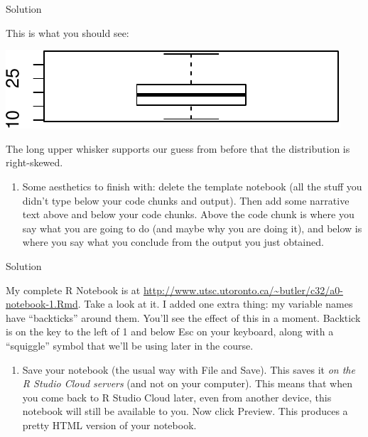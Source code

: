 \documentclass[]{tufte-book}
\newenvironment{Shaded}{}{}
\newcommand{\KeywordTok}[1]{\textcolor[rgb]{0.00,0.44,0.13}{\textbf{#1}}}
\newcommand{\NormalTok}[1]{#1}
\newcommand{\OperatorTok}[1]{\textcolor[rgb]{0.40,0.40,0.40}{#1}}
\providecommand{\tightlist}{%
  \setlength{\itemsep}{0pt}\setlength{\parskip}{0pt}}
\theoremstyle{definition}
\theoremstyle{definition}
\theoremstyle{definition}
\theoremstyle{remark}
\begin{document}
Solution

This is what you should see:

\begin{Shaded}
\end{Shaded}

\includegraphics{01-getting-used_files/figure-latex/unnamed-chunk-8-1}

The long upper whisker supports our guess from before that the
distribution is right-skewed.

\begin{enumerate}
\def\labelenumi{(\alph{enumi})}
\setcounter{enumi}{7}
\tightlist
\item
  Some aesthetics to finish with: delete the template notebook (all the
  stuff you didn't type below your code chunks and output). Then add
  some narrative text above and below your code chunks. Above the code
  chunk is where you say what you are going to do (and maybe why you are
  doing it), and below is where you say what you conclude from the
  output you just obtained.
\end{enumerate}

Solution

My complete R Notebook is at
\url{http://www.utsc.utoronto.ca/~butler/c32/a0-notebook-1.Rmd}. Take a
look at it. I added one extra thing: my variable names have
``backticks'' around them. You'll see the effect of this in a moment.
Backtick is on the key to the left of 1 and below Esc on your keyboard,
along with a ``squiggle'' symbol that we'll be using later in the
course.

\begin{enumerate}
\def\labelenumi{(\roman{enumi})}
\tightlist
\item
  Save your notebook (the usual way with File and Save). This saves it
  \emph{on the R Studio Cloud servers} (and not on your computer). This
  means that when you come back to R Studio Cloud later, even from
  another device, this notebook will still be available to you. Now
  click Preview. This produces a pretty HTML version of your notebook.
\end{enumerate}
\end{document}
